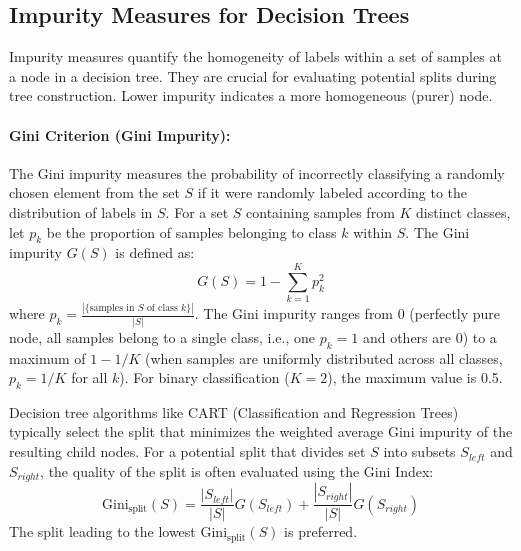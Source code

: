 \begin{appendices}
  \subsection{Impurity Measures for Decision Trees}
  \label{app:impurity_measures}
  Impurity measures quantify the homogeneity of labels within a set of samples at a node in a decision tree. They are crucial for evaluating potential splits during tree construction. Lower impurity indicates a more homogeneous (purer) node.

  \paragraph{Gini Criterion (Gini Impurity):}
  The Gini impurity measures the probability of incorrectly classifying a randomly chosen element from the set $S$ if it were randomly labeled according to the distribution of labels in $S$. For a set $S$ containing samples from $K$ distinct classes, let $p_k$ be the proportion of samples belonging to class $k$ within $S$. The Gini impurity $G(S)$ is defined as:
  \begin{equation}
    G(S) = 1 - \sum_{k=1}^{K} p_k^2
    \label{eq:gini_impurity}
  \end{equation}
  where $p_k = \frac{|\{ \text{samples in } S \text{ of class } k \}|}{|S|}$.
  The Gini impurity ranges from 0 (perfectly pure node, all samples belong to a single class, i.e., one $p_k=1$ and others are 0) to a maximum of $1 - 1/K$ (when samples are uniformly distributed across all classes, $p_k=1/K$ for all $k$). For binary classification ($K=2$), the maximum value is 0.5.

  Decision tree algorithms like CART (Classification and Regression Trees) typically select the split that minimizes the weighted average Gini impurity of the resulting child nodes. For a potential split that divides set $S$ into subsets $S_{left}$ and $S_{right}$, the quality of the split is often evaluated using the Gini Index:
  \begin{equation}
    \text{Gini}_{\text{split}}(S) = \frac{|S_{left}|}{|S|} G(S_{left}) + \frac{|S_{right}|}{|S|} G(S_{right})
    \label{eq:gini_split}
  \end{equation}
  The split leading to the lowest $\text{Gini}_{\text{split}}(S)$ is preferred.


\end{appendices}
